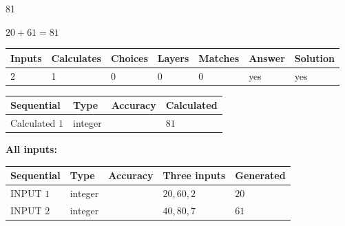 \documentclass[12pt]{article}
\begin{document}
 
 
\noindent{}
 
 

81
 
 
\noindent{}
 
 

 
 
 
\noindent{}
 
 

$ %
20 +  %
61=   %
81$
 
 
\noindent{}
 
 

 
   
   
   
   
\noindent\begin{tabular}{|l|l|l|l|l|l|l|}
 \hline
Inputs & Calculates & Choices & Layers & Matches & Answer & Solution \\ \hline
 2  & 
 1  & 
 0
  & 
 0  & 
 0  & 
  yes & 
  yes 
  \\ \hline
 \end{tabular}
   
   
   
   
\noindent{}
   
   
  
  
\noindent\begin{tabular}{|l|l|l|l|}
\hline
 Sequential & Type & Accuracy & Calculated \\ 
\hline
 
 
  Calculated $  1 $ & integer &  & 
  $ 81 $ 
 \\  \hline  
 \end{tabular}
   
   
   
   
\noindent\vspace{0.1in}\hspace{-0.08in} {\textbf{\Large{All inputs: }}}
   
   
  
  
\noindent\begin{tabular}{|l|l|l|l|l|}
\hline
 Sequential & Type & Accuracy & Three inputs & Generated \\ 
\hline
 
 
  INPUT $  1 $ & integer &  & $
 20
 , 
 60
 , 
 2
 $ & $ 20 $ 
 \\  \hline  
 
 
  INPUT $  2 $ & integer &  & $
 40
 , 
 80
 , 
 7
 $ & $ 61 $ 
 \\  \hline  
 \end{tabular}
   
\end{document}
